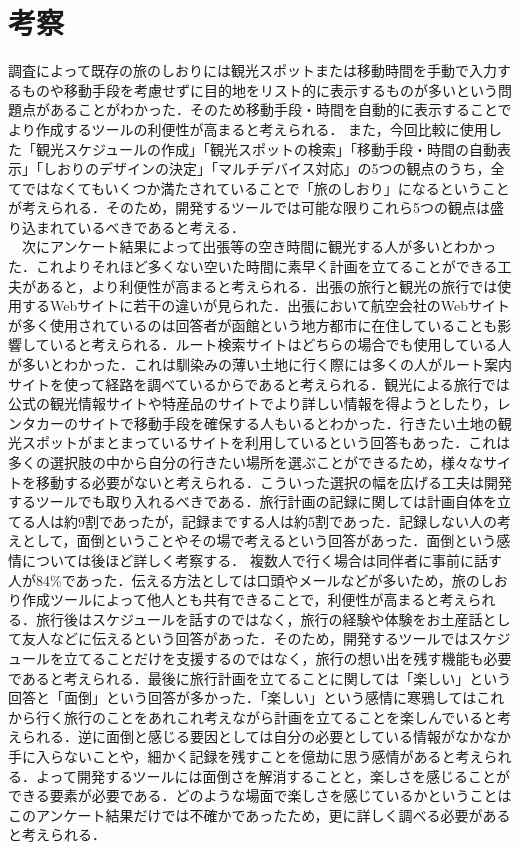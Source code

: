 \documentclass{funthesis}
\begin{document}
\section{考察}
調査によって既存の旅のしおりには観光スポットまたは移動時間を手動で入力するものや移動手段を考慮せずに目的地をリスト的に表示するものが多いという問題点があることがわかった．そのため移動手段・時間を自動的に表示することでより作成するツールの利便性が高まると考えられる．
また，今回比較に使用した「観光スケジュールの作成」「観光スポットの検索」「移動手段・時間の自動表示」「しおりのデザインの決定」「マルチデバイス対応」の5つの観点のうち，全てではなくてもいくつか満たされていることで「旅のしおり」になるということが考えられる．そのため，開発するツールでは可能な限りこれら5つの観点は盛り込まれているべきであると考える．\\
　次にアンケート結果によって出張等の空き時間に観光する人が多いとわかった．これよりそれほど多くない空いた時間に素早く計画を立てることができる工夫があると，より利便性が高まると考えられる．出張の旅行と観光の旅行では使用するWebサイトに若干の違いが見られた．出張において航空会社のWebサイトが多く使用されているのは回答者が函館という地方都市に在住していることも影響していると考えられる．ルート検索サイトはどちらの場合でも使用している人が多いとわかった．これは馴染みの薄い土地に行く際には多くの人がルート案内サイトを使って経路を調べているからであると考えられる．観光による旅行では公式の観光情報サイトや特産品のサイトでより詳しい情報を得ようとしたり，レンタカーのサイトで移動手段を確保する人もいるとわかった．行きたい土地の観光スポットがまとまっているサイトを利用しているという回答もあった．これは多くの選択肢の中から自分の行きたい場所を選ぶことができるため，様々なサイトを移動する必要がないと考えられる．こういった選択の幅を広げる工夫は開発するツールでも取り入れるべきである．旅行計画の記録に関しては計画自体を立てる人は約9割であったが，記録までする人は約5割であった．記録しない人の考えとして，面倒ということやその場で考えるという回答があった．面倒という感情については後ほど詳しく考察する．
複数人で行く場合は同伴者に事前に話す人が84\%であった．伝える方法としては口頭やメールなどが多いため，旅のしおり作成ツールによって他人とも共有できることで，利便性が高まると考えられる．旅行後はスケジュールを話すのではなく，旅行の経験や体験をお土産話として友人などに伝えるという回答があった．そのため，開発するツールではスケジュールを立てることだけを支援するのではなく，旅行の想い出を残す機能も必要であると考えられる．最後に旅行計画を立てることに関しては「楽しい」という回答と「面倒」という回答が多かった．「楽しい」という感情に寒鴉してはこれから行く旅行のことをあれこれ考えながら計画を立てることを楽しんでいると考えられる．逆に面倒と感じる要因としては自分の必要としている情報がなかなか手に入らないことや，細かく記録を残すことを億劫に思う感情があると考えられる．よって開発するツールには面倒さを解消することと，楽しさを感じることができる要素が必要である．どのような場面で楽しさを感じているかということはこのアンケート結果だけでは不確かであったため，更に詳しく調べる必要があると考えられる．
\end{document}
